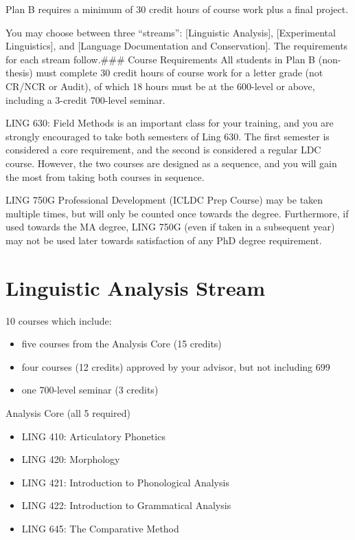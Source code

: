 \documentclass[
]{book}
\providecommand{\tightlist}{%
  \setlength{\itemsep}{0pt}\setlength{\parskip}{0pt}}
\begin{document}
Plan B requires a minimum of 30 credit hours of course work plus a final project.

You may choose between three ``streams'': {[}Linguistic Analysis{]}, {[}Experimental Linguistics{]}, and {[}Language Documentation and Conservation{]}. The requirements for each stream follow.\#\#\# Course Requirements
All students in Plan B (non-thesis) must complete 30 credit hours of course work for a letter grade (not CR/NCR or Audit), of which 18 hours must be at the 600-level or above, including a 3-credit 700-level seminar.

LING 630: Field Methods is an important class for your training, and you are strongly encouraged to take both semesters of Ling 630. The first semester is considered a core requirement, and the second is considered a regular LDC course. However, the two courses are designed as a sequence, and you will gain the most from taking both courses in sequence.

LING 750G Professional Development (ICLDC Prep Course) may be taken multiple times, but will only be counted once towards the degree. Furthermore, if used towards the MA degree, LING 750G (even if taken in a subsequent year) may not be used later towards satisfaction of any PhD degree requirement.

\hypertarget{linguistic-analysis-stream}{%
\section{Linguistic Analysis Stream}\label{linguistic-analysis-stream}}

10 courses which include:

\begin{itemize}
\tightlist
\item
  five courses from the Analysis Core (15 credits)
\item
  four courses (12 credits) approved by your advisor, but not including 699
\item
  one 700-level seminar (3 credits)
\end{itemize}

Analysis Core (all 5 required)

\begin{itemize}
\tightlist
\item
  LING 410: Articulatory Phonetics
\item
  LING 420: Morphology
\item
  LING 421: Introduction to Phonological Analysis
\item
  LING 422: Introduction to Grammatical Analysis
\item
  LING 645: The Comparative Method
\end{itemize}
\end{document}
